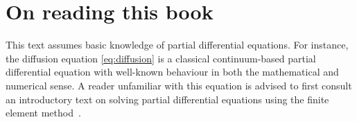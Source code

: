 %
%



\section{On reading this book}

This text assumes basic knowledge of partial differential
equations. For instance, the diffusion equation \eqref{eq:diffusion}
is a classical continuum-based partial differential equation with
well-known behaviour in both the mathematical and numerical sense. A
reader unfamiliar with this equation is advised to first consult an
introductory text on solving partial differential equations using the
finite element method~\cite{tveito2004introduction,
  langtangen2016solving, gockenbach2006understanding,
  langtangen2019introduction}.

